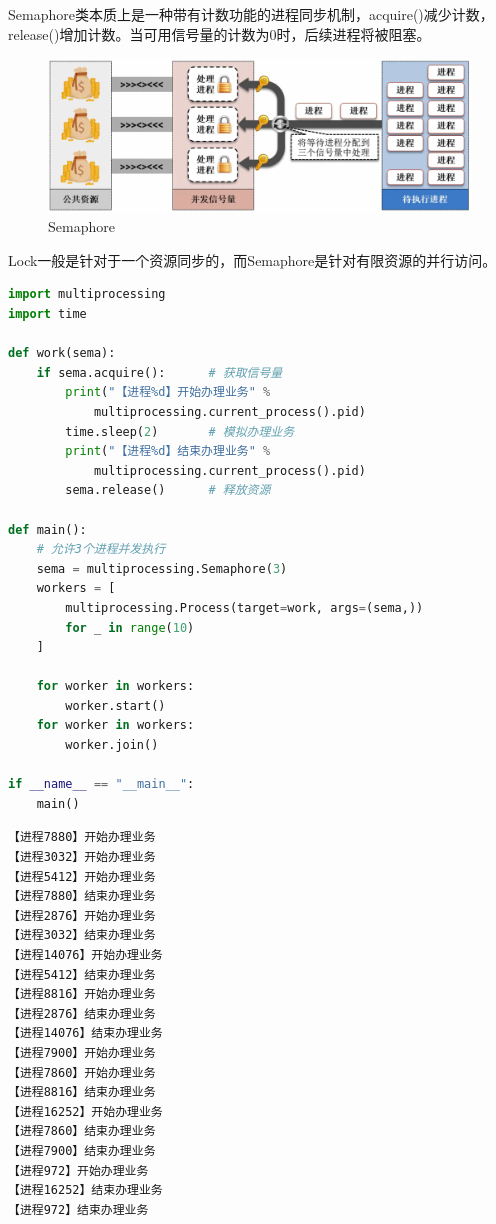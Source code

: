 Semaphore类本质上是一种带有计数功能的进程同步机制，acquire()减少计数，release()增加计数。当可用信号量的计数为0时，后续进程将被阻塞。

\begin{figure}[H]
	\centering
	\includegraphics[scale=0.6]{img/C11/11-6/2.png}
	\caption{Semaphore}
\end{figure}

Lock一般是针对于一个资源同步的，而Semaphore是针对有限资源的并行访问。\\


\begin{lstlisting}[language=Python]
import multiprocessing
import time

def work(sema):
	if sema.acquire():      # 获取信号量
		print("【进程%d】开始办理业务" % 
			multiprocessing.current_process().pid)
		time.sleep(2)       # 模拟办理业务
		print("【进程%d】结束办理业务" % 
			multiprocessing.current_process().pid)
		sema.release()      # 释放资源

def main():
	# 允许3个进程并发执行
	sema = multiprocessing.Semaphore(3)
	workers = [
		multiprocessing.Process(target=work, args=(sema,))
		for _ in range(10)
	]

	for worker in workers:
		worker.start()
	for worker in workers:
		worker.join()

if __name__ == "__main__":
	main()
\end{lstlisting}

\begin{tcolorbox}
	\begin{verbatim}
【进程7880】开始办理业务
【进程3032】开始办理业务
【进程5412】开始办理业务
【进程7880】结束办理业务
【进程2876】开始办理业务
【进程3032】结束办理业务
【进程14076】开始办理业务
【进程5412】结束办理业务
【进程8816】开始办理业务
【进程2876】结束办理业务
【进程14076】结束办理业务
【进程7900】开始办理业务 
【进程7860】开始办理业务 
【进程8816】结束办理业务 
【进程16252】开始办理业务
【进程7860】结束办理业务
【进程7900】结束办理业务
【进程972】开始办理业务
【进程16252】结束办理业务
【进程972】结束办理业务
\end{verbatim}
\end{tcolorbox}

\newpage